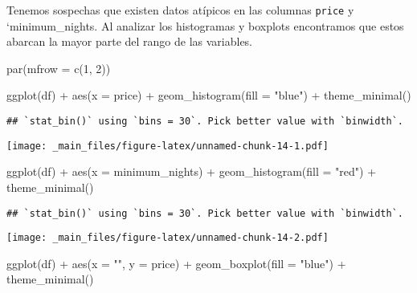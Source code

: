 \documentclass[
]{book}
\newenvironment{Shaded}{\begin{snugshade}}{\end{snugshade}}
\newcommand{\AttributeTok}[1]{\textcolor[rgb]{0.77,0.63,0.00}{#1}}
\newcommand{\DecValTok}[1]{\textcolor[rgb]{0.00,0.00,0.81}{#1}}
\newcommand{\FunctionTok}[1]{\textcolor[rgb]{0.00,0.00,0.00}{#1}}
\newcommand{\NormalTok}[1]{#1}
\newcommand{\SpecialCharTok}[1]{\textcolor[rgb]{0.00,0.00,0.00}{#1}}
\newcommand{\StringTok}[1]{\textcolor[rgb]{0.31,0.60,0.02}{#1}}
\begin{document}
Tenemos sospechas que existen datos atípicos en las columnas \texttt{price} y `minimum\_nights. Al analizar los histogramas y boxplots encontramos que estos abarcan la mayor parte del rango de las variables.

\begin{Shaded}
\begin{Highlighting}[]
\FunctionTok{par}\NormalTok{(}\AttributeTok{mfrow =} \FunctionTok{c}\NormalTok{(}\DecValTok{1}\NormalTok{, }\DecValTok{2}\NormalTok{))}

\FunctionTok{ggplot}\NormalTok{(df) }\SpecialCharTok{+}
  \FunctionTok{aes}\NormalTok{(}\AttributeTok{x =}\NormalTok{ price) }\SpecialCharTok{+}
  \FunctionTok{geom\_histogram}\NormalTok{(}\AttributeTok{fill =} \StringTok{"blue"}\NormalTok{) }\SpecialCharTok{+}
  \FunctionTok{theme\_minimal}\NormalTok{()}
\end{Highlighting}
\end{Shaded}

\begin{verbatim}
## `stat_bin()` using `bins = 30`. Pick better value with `binwidth`.
\end{verbatim}

\texttt{[image: \_main\_files/figure-latex/unnamed-chunk-14-1.pdf]}

\begin{Shaded}
\begin{Highlighting}[]
\FunctionTok{ggplot}\NormalTok{(df) }\SpecialCharTok{+}
  \FunctionTok{aes}\NormalTok{(}\AttributeTok{x =}\NormalTok{ minimum\_nights) }\SpecialCharTok{+}
  \FunctionTok{geom\_histogram}\NormalTok{(}\AttributeTok{fill =} \StringTok{"red"}\NormalTok{) }\SpecialCharTok{+}
  \FunctionTok{theme\_minimal}\NormalTok{()}
\end{Highlighting}
\end{Shaded}

\begin{verbatim}
## `stat_bin()` using `bins = 30`. Pick better value with `binwidth`.
\end{verbatim}

\texttt{[image: \_main\_files/figure-latex/unnamed-chunk-14-2.pdf]}

\begin{Shaded}
\begin{Highlighting}[]
\FunctionTok{ggplot}\NormalTok{(df) }\SpecialCharTok{+}
  \FunctionTok{aes}\NormalTok{(}\AttributeTok{x =} \StringTok{""}\NormalTok{, }\AttributeTok{y =}\NormalTok{ price) }\SpecialCharTok{+}
  \FunctionTok{geom\_boxplot}\NormalTok{(}\AttributeTok{fill =} \StringTok{"blue"}\NormalTok{) }\SpecialCharTok{+}
  \FunctionTok{theme\_minimal}\NormalTok{()}
\end{Highlighting}
\end{Shaded}
\end{document}
